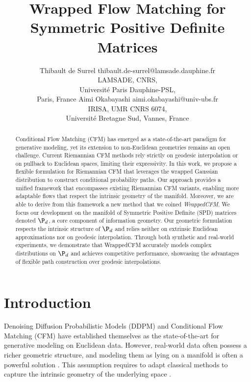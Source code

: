 \documentclass[10pt]{article} %
\title{Wrapped Flow Matching for Symmetric Positive Definite Matrices}
\author{\name Thibault de Surrel \email thibault.de-surrel@lamsade.dauphine.fr \\
  \addr LAMSADE, CNRS,\\
  Université Paris Dauphine-PSL, \\
  Paris, France
  \AND
  \name Aimi Okabayashi \email aimi.okabayashi@univ-ubs.fr \\
  \addr IRISA, UMR CNRS 6074, \\
  Université Bretagne Sud,
  Vannes, France
}
\theoremstyle{plain}
\theoremstyle{definition}
\theoremstyle{remark}
\begin{document}
\maketitle

\begin{abstract}
  Conditional Flow Matching (CFM) has emerged as a state-of-the-art paradigm for generative modeling, yet its extension to non-Euclidean geometries remains an open challenge. Current Riemannian CFM methods rely strictly on geodesic interpolation or on pullback to Euclidean spaces, limiting their expressivity. In this work, we propose a flexible formulation for Riemannian CFM that leverages the wrapped Gaussian distribution to construct conditional probability paths. Our approach provides a unified framework that encompasses existing Riemannian CFM variants, enabling more adaptable flows that respect the intrinsic geometry of the manifold. Moreover, we are able to derive from this framework a new method that we coined \emph{WrappedCFM}. We focus our development on the manifold of Symmetric Positive Definite (SPD) matrices denoted $\P_d$, a core component of information geometry. Our geometric formulation respects the intrinsic structure of $\P_d$ and relies neither on extrinsic Euclidean approximations nor on geodesic interpolation. Through both synthetic and real-world experiments, we demonstrate that WrappedCFM accurately models complex distributions on $\P_d$ and achieves competitive performance, showcasing the advantages of flexible path construction over geodesic interpolations.

\end{abstract}

\section{Introduction}
Denoising Diffusion Probabilistic Models (DDPM) \citep{ho2020denoising, song2021scorebased} and Conditional Flow Matching (CFM) \citep{lipmanFlowMatchingGenerative2023, liu2022flow, jung2024flowavse} have established themselves as the state-of-the-art for generative modeling on Euclidean data. However, real-world data often possess a richer geometric structure, and modeling them as lying on a manifold is often a powerful solution \citep{Papillon_2025}. This assumption requires to adapt classical methods to capture the intrinsic geometry of the underlying space \citep{pennecIntrinsicStatisticsRiemannian2006, guigui2023introduction}.
\end{document}
